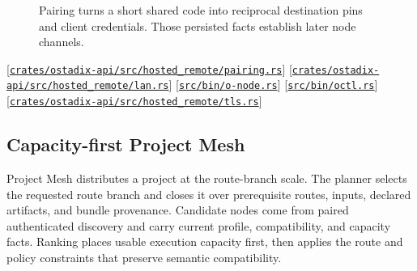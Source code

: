 \documentclass[11pt,oneside]{article}
\newcommand{\src}[1]{\textcolor{OSlate}{\scriptsize[\href{https://github.com/lostadi/OSTADIX/blob/c0b02c326b2329a95ba52447c7180bc93957cd57/#1}{\nolinkurl{#1}}]}\allowbreak}
\begin{document}
\begin{figure}[htbp]
\centering
{}
\caption{Pairing turns a short shared code into reciprocal destination pins and
client credentials. Those persisted facts establish later node channels.}
\label{fig:pairing}
\end{figure}

\src{crates/ostadix-api/src/hosted_remote/pairing.rs}
\src{crates/ostadix-api/src/hosted_remote/lan.rs}
\src{src/bin/o-node.rs}
\src{src/bin/octl.rs}
\src{crates/ostadix-api/src/hosted_remote/tls.rs}

\subsection{Capacity-first Project Mesh}
\label{sec:mesh}

Project Mesh distributes a project at the route-branch scale. The planner
selects the requested route branch and closes it over prerequisite routes,
inputs, declared artifacts, and bundle provenance. Candidate nodes come from
paired authenticated discovery and carry current profile, compatibility, and
capacity facts. Ranking places usable execution capacity first, then applies
the route and policy constraints that preserve semantic compatibility.
\end{document}
